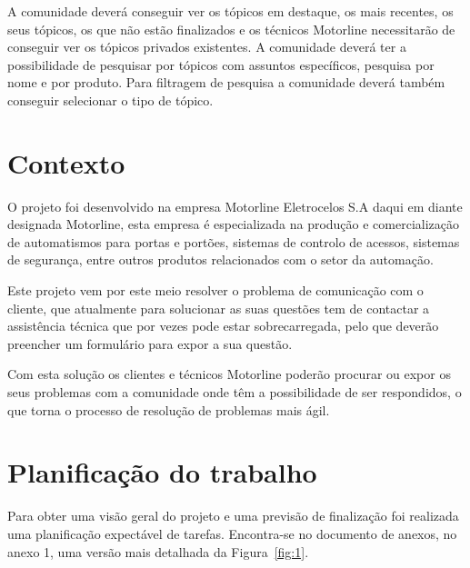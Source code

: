 A comunidade deverá conseguir ver os tópicos em destaque, os mais recentes, os seus tópicos, os que não estão finalizados e os técnicos Motorline necessitarão de conseguir ver os tópicos privados existentes. A comunidade deverá ter a possibilidade de pesquisar por tópicos com assuntos específicos, pesquisa por nome e por produto. Para filtragem de pesquisa a comunidade deverá também conseguir selecionar o tipo de tópico.

\section{Contexto}
O projeto foi desenvolvido na empresa Motorline Eletrocelos S.A daqui em diante designada Motorline, esta empresa é especializada na produção e comercialização de automatismos para portas e portões, sistemas de controlo de acessos, sistemas de segurança, entre outros produtos relacionados com o setor da automação.

Este projeto vem por este meio resolver o problema de comunicação com o cliente, que atualmente para solucionar as suas questões tem de contactar a assistência técnica que por vezes pode estar sobrecarregada, pelo que deverão preencher um formulário para expor a sua questão.

Com esta solução os clientes e técnicos Motorline poderão procurar ou expor os seus problemas com a comunidade onde têm a possibilidade de ser respondidos, o que torna o processo de resolução de problemas mais ágil.

\newpage

\section{Planificação do trabalho}\label{sec:planificacao trabalho}

Para obter uma visão geral do projeto e uma previsão de finalização foi realizada uma planificação expectável de tarefas. Encontra-se no documento de anexos, no anexo 1, uma versão mais detalhada da Figura~\ref*{fig:1}.

